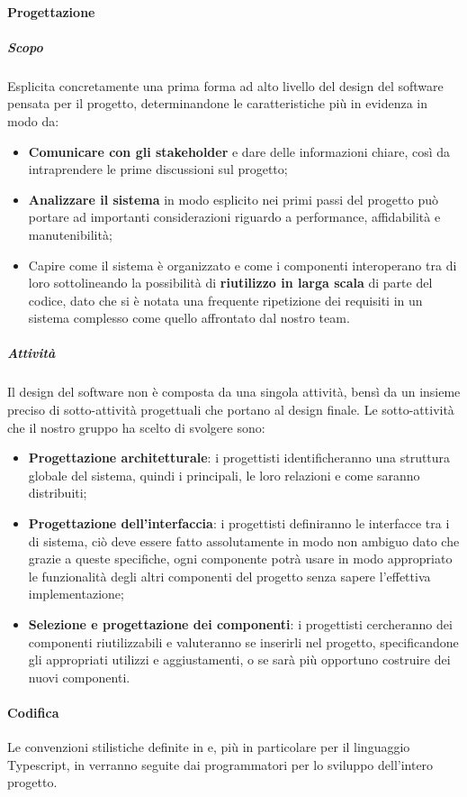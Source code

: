 \paragraph{Progettazione}
\subparagraph{Scopo}\Spazio
Esplicita concretamente una prima forma ad alto livello del design del software pensata per il progetto, determinandone le caratteristiche più in evidenza in modo da:
	\begin{itemize}
	\item \textbf{{Comunicare con gli stakeholder}} e dare delle informazioni chiare, così da intraprendere le prime discussioni sul progetto;
	\item \textbf{{Analizzare il sistema}} in modo esplicito nei primi passi del progetto può portare ad importanti considerazioni riguardo a performance, affidabilità e manutenibilità;
	\item Capire come il sistema è organizzato e come i componenti interoperano tra di loro sottolineando la possibilità di \textbf{{riutilizzo in larga scala}} di parte del codice, dato che si è notata una frequente ripetizione dei requisiti in un sistema complesso come quello affrontato dal nostro team.  	
	\end{itemize} 	
\subparagraph{Attività}\Spazio
Il design del software non è composta da una singola attività, bensì da un insieme preciso di sotto-attività progettuali che portano al design finale.
Le sotto-attività che il nostro gruppo ha scelto di svolgere sono:
	\begin{itemize}
	\item\textbf{{Progettazione architetturale}}: i progettisti identificheranno una struttura globale del sistema, quindi i  principali, le loro relazioni e come saranno distribuiti;
	\item\textbf{{Progettazione dell'interfaccia}}: i progettisti definiranno le interfacce tra i  di sistema, ciò deve essere fatto assolutamente in modo non ambiguo dato che grazie a queste specifiche, ogni componente potrà usare in modo appropriato le funzionalità degli altri componenti del progetto senza sapere l'effettiva implementazione;
	\item\textbf{{Selezione e progettazione dei componenti}}: i progettisti cercheranno dei componenti riutilizzabili e valuteranno se inserirli nel progetto, specificandone gli appropriati utilizzi e aggiustamenti, o se sarà più opportuno costruire dei nuovi componenti.
\end{itemize}
\paragraph{Codifica}\Spazio
Le convenzioni stilistiche definite in  e, più in particolare per il linguaggio Typescript, in  verranno seguite dai programmatori per lo sviluppo dell'intero progetto.

